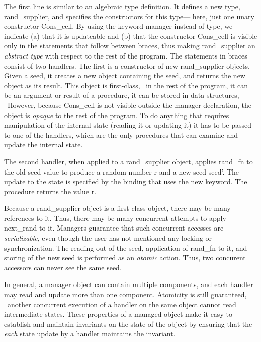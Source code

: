 The first line is similar to an algebraic type definition.  It defines
a new type, {\cf rand\_supplier}, and specifies the constructors for
this type--- here, just one unary constructor {\cf Cons\_cell}.  By
using the keyword {\cf manager} instead of {\cf type}, we indicate (a)
that it is updateable and (b) that the constructor {\cf Cons\_cell} is
visible only in the statements that follow between braces, thus making
{\cf rand\_supplier} an {\em abstract type\/} with respect to the rest
of the program.  The statements in braces consist of two handlers.
The first is a constructor of new {\cf rand\_supplier} objects.  Given
a seed, it creates a new object containing the seed, and returns the
new object as its result.  This object is first-class, \ie\ in the
rest of the program, it can be an argument or result of a procedure,
it can be stored in data structures, \etc\ However, because {\cf
Cons\_cell} is not visible outside the manager declaration, the object
is {\em opaque\/} to the rest of the program.  To
do anything that requires manipulation of the internal state (reading
it or updating it) it has to be passed to one of the handlers, which
are the only procedures that can examine and update the internal
state.

The second handler, when applied to a {\cf rand\_supplier} object,
applies {\cf rand\_fn} to the old seed value to produce a random
number {\cf r} and a new seed {\cf seed'}.  The update to the state is
specified by the binding that uses the \mbox{\cf new} keyword.  The
procedure returns the value {\cf r}.

Because a {\cf rand\_supplier} object is a first-class object, there
may be many references to it.  Thus, there may be many concurrent
attempts to apply {\cf next\_rand} to it.  Managers guarantee that
such concurrent accesses are {\em serializable\/}, even though the
user has not mentioned any locking or synchronization.  The
reading-out of the seed, application of {\cf rand\_fn} to it, and
storing of the new seed is performed as an {\em atomic\/} action.
Thus, two concurent accessors can never see the same seed.

In general, a manager object can contain multiple components, and each
handler may read and update more than one component.  Atomicity is
still guaranteed, \ie\ another concurrent execution of a handler on
the same object cannot read intermediate states.  These properties of
a managed object make it easy to establish and maintain invariants on
the state of the object by ensuring that the {\em each\/} state update
by a handler maintains the invariant.

